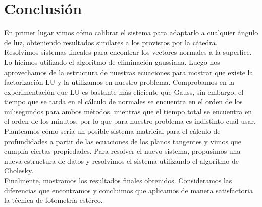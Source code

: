 \section{Conclusión}

En primer lugar vimos cómo calibrar el sistema para adaptarlo a cualquier ángulo de luz, obteniendo resultados similares a los provistos por la cátedra. \\

Resolvimos sistemas lineales para encontrar los vectores normales a la superfice. Lo hicimos utilizado el algoritmo de eliminación gaussiana. Luego nos aprovechamos de la estructura de nuestras ecuaciones para mostrar que existe la factorización LU y la utilizamos en nuestro problema. Comprobamos en la experimentación que LU es bastante más eficiente que Gauss, sin embargo, el tiempo que se tarda en el cálculo de normales se encuentra en el orden de los milisegundos para ambos métodos, mientras que el tiempo total se encuentra en el orden de los minutos, por lo que para nuestro problema es indistinto cuál usar. \\

Planteamos cómo sería un posible sistema matricial para el cálculo de profundidades a partir de las ecuaciones de los planos tangentes y vimos que cumplía ciertas propiedades. Para resolver el nuevo sistema, propusimos una nueva estructura de datos y resolvimos el sistema utilizando el algoritmo de Cholesky. \\

Finalmente, mostramos los resultados finales obtenidos. Consideramos las diferencias que encontramos y concluimos que aplicamos de manera satisfactoria la técnica de fotometría estéreo. \\
